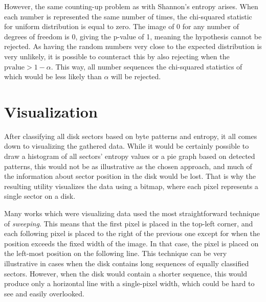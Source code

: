 \documentclass[
  digital, %
  oneside, %
  lof,     %
  lot,     %
]{fithesis4}
\begin{document}
However, the same counting-up problem as with Shannon's entropy arises.
When each number is represented the same number of times, the chi-squared statistic for uniform distribution is equal to zero.
The image of 0 for any number of degrees of freedom is 0, giving the p-value of 1, meaning the hypothesis cannot be rejected.
As having the random numbers very close to the expected distribution is very unlikely, it is possible to counteract this by also rejecting when the $\text{pvalue} > 1 - \alpha$.\cite{knuth81}
This way, all number sequences the chi-squared statistics of which would be less likely than $\alpha$ will be rejected.

\section{Visualization}
After classifying all disk sectors based on byte patterns and entropy, it all comes down to visualizing the gathered data.
While it would be certainly possible to draw a histogram of all sectors' entropy values or a pie graph based on detected patterns, this would not be as illustrative as the chosen approach, and much of the information about sector position in the disk would be lost.
That is why the resulting utility visualizes the data using a bitmap, where each pixel represents a single sector on a disk.

Many works which were visualizing data used the most straightforward technique of \emph{sweeping}. \cite{hargreaves13, charalampidis18, broz11}
This means that the first pixel is placed in the top-left corner, and each following pixel is placed to the right of the previous one except for when the position exceeds the fixed width of the image.
In that case, the pixel is placed on the left-most position on the following line.
This technique can be very illustrative in cases when the disk contains long sequences of equally classified sectors.
However, when the disk would contain a shorter sequence, this would produce only a horizontal line with a single-pixel width, which could be hard to see and easily overlooked. 

\end{document}
